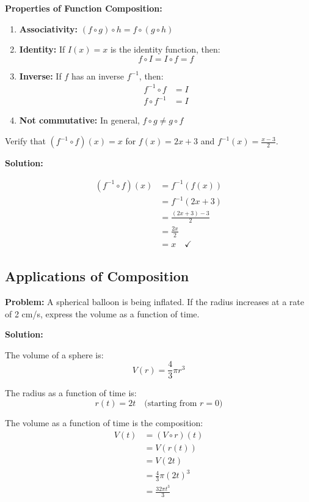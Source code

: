 \documentclass[12pt,a4paper]{article}
\begin{document}
\begin{theorem}
\textbf{Properties of Function Composition:}

\begin{enumerate}
    \item \textbf{Associativity:} $(f \circ g) \circ h = f \circ (g \circ h)$
    
    \item \textbf{Identity:} If $I(x) = x$ is the identity function, then:
    \[
    f \circ I = I \circ f = f
    \]
    
    \item \textbf{Inverse:} If $f$ has an inverse $f^{-1}$, then:
    \begin{align*}
    f^{-1} \circ f &= I \\
    f \circ f^{-1} &= I
    \end{align*}
    
    \item \textbf{Not commutative:} In general, $f \circ g \neq g \circ f$
\end{enumerate}
\end{theorem}

\begin{example}
Verify that $(f^{-1} \circ f)(x) = x$ for $f(x) = 2x + 3$ and $f^{-1}(x) = \frac{x-3}{2}$.

\textbf{Solution:}

\begin{align*}
(f^{-1} \circ f)(x) &= f^{-1}(f(x)) \\
&= f^{-1}(2x + 3) \\
&= \frac{(2x+3) - 3}{2} \\
&= \frac{2x}{2} \\
&= x \quad \checkmark
\end{align*}
\end{example}

\subsection{Applications of Composition}

\begin{example}
\textbf{Problem:} A spherical balloon is being inflated. If the radius increases at a rate of 2 cm/s, express the volume as a function of time.

\textbf{Solution:}

The volume of a sphere is:
\[
V(r) = \frac{4}{3}\pi r^3
\]

The radius as a function of time is:
\[
r(t) = 2t \quad \text{(starting from $r = 0$)}
\]

The volume as a function of time is the composition:
\begin{align*}
V(t) &= (V \circ r)(t) \\
&= V(r(t)) \\
&= V(2t) \\
&= \frac{4}{3}\pi(2t)^3 \\
&= \frac{32\pi t^3}{3}
\end{align*}
\end{example}
\end{document}
